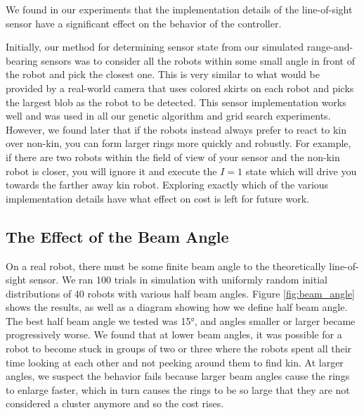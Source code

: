 \documentclass[conference]{IEEEtran}
\begin{document}
    We found in our experiments that the implementation details of the line-of-sight sensor have a significant effect on the behavior of the controller.

    Initially, our method for determining sensor state from our simulated range-and-bearing sensors was to consider all the robots within some small angle in front of the robot and pick the closest one. This is very similar to what would be provided by a real-world camera that uses colored skirts on each robot and picks the largest blob as the robot to be detected. This sensor implementation works well and was used in all our genetic algorithm and grid search experiments. However, we found later that if the robots instead always prefer to react to kin over non-kin, you can form larger rings more quickly and robustly. For example, if there are two robots within the field of view of your sensor and the non-kin robot is closer, you will ignore it and execute the $I=1$ state which will drive you towards the farther away kin robot. Exploring exactly which of the various implementation details have what effect on cost is left for future work.

  \subsection{The Effect of the Beam Angle} \label{section:beam_angle}

    On a real robot, there must be some finite beam angle to the theoretically line-of-sight sensor. We ran 100 trials in simulation with uniformly random initial distributions of 40 robots with various half beam angles. Figure \ref{fig:beam_angle} shows the results, as well as a diagram showing how we define half beam angle. The best half beam angle we tested was \ang{15}, and angles smaller or larger became progressively worse. We found that at lower beam angles, it was possible for a robot to become stuck in groups of two or three where the robots spent all their time looking at each other and not peeking around them to find kin. At larger angles, we suspect the behavior fails because larger beam angles cause the rings to enlarge faster, which in turn causes the rings to be so large that they are not considered a cluster anymore and so the cost rises.
\end{document}
